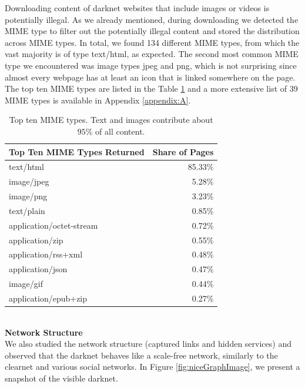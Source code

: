 \documentclass[USenglish,oneside,twocolumn]{article}
\newcommand{\sh}[1]{\noindent\vspace{0.5\baselineskip}\\ \textbf{#1}\\}
\begin{document}
Downloading content of darknet websites that include images or videos is potentially illegal. As we already mentioned, during downloading we detected the MIME type to filter out the potentially illegal content and stored the distribution across MIME types. In total, we found 134 different MIME types, from which the vast majority is of type text/html, as expected. The second most common MIME type we encountered was image types jpeg and png, which is not surprising since almost every webpage has at least an icon that is linked somewhere on the page. The top ten MIME types are listed in the Table \ref{table:mime types} and a more extensive list of 39 MIME types is available in Appendix \ref{appendix:A}.

 \begin{table}
    \centering
    \caption{Top ten MIME types. Text and images contribute about $95\%$ of all content.}
    \label{table:mime types}
    \begin{tabular}{p{5cm} | r{2.5cm} }
         \textbf{Top Ten MIME Types Returned} & \textbf{Share of Pages} \\
         \hline
         \hline
    	text/html			&	85.33\% \\
    	\hline
    	image/jpeg			&	5.28\% \\
    	\hline
    	image/png			&	3.23\% \\
    	\hline
    	text/plain			&	0.85\% \\
    	\hline
    	application/octet-stream		&	0.72\% \\
    	\hline
    	application/zip		&	0.55\% \\
    	\hline
    	application/rss+xml	&	0.48\% \\
    	\hline
    	application/json	&	0.47\% \\
    	\hline
    	image/gif			&	0.44\% \\
    	\hline
    	application/epub+zip			&	0.27\% \\
    \end{tabular}
\end{table}
%
%
\sh{Network Structure}\label{sh:networkStructure}
We also studied the network structure (captured links and hidden services) and observed that the darknet behaves like a scale-free network, similarly to the clearnet and various social networks.
In Figure \ref{fig:niceGraphImage}, we present a snapshot of the visible darknet.
\end{document}
